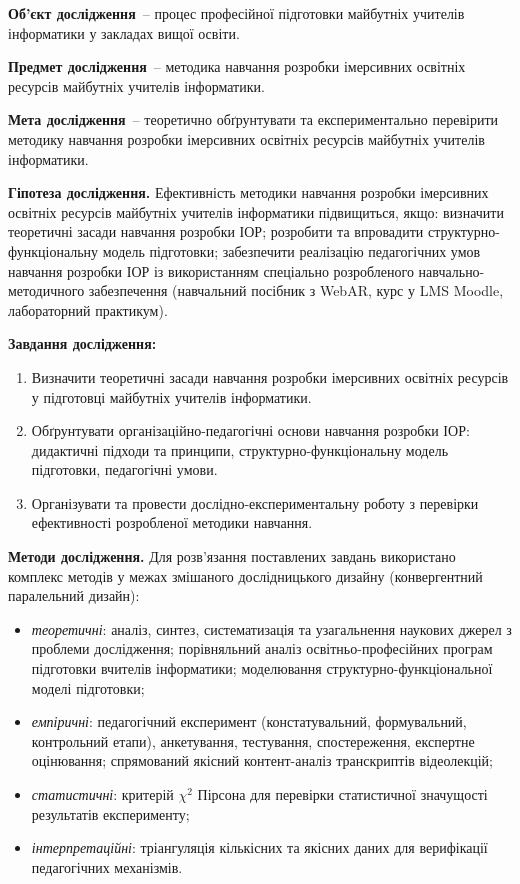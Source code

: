 \textbf{Об'єкт дослідження}~-- процес професійної підготовки майбутніх учителів інформатики у закладах вищої освіти.

\textbf{Предмет дослідження}~-- методика навчання розробки імерсивних освітніх ресурсів майбутніх учителів інформатики.

\textbf{Мета дослідження}~-- теоретично обґрунтувати та експериментально перевірити методику навчання розробки імерсивних освітніх ресурсів майбутніх учителів інформатики.

\textbf{Гіпотеза дослідження.} Ефективність методики навчання розробки імерсивних освітніх ресурсів майбутніх учителів інформатики підвищиться, якщо: визначити теоретичні засади навчання розробки ІОР; розробити та впровадити структурно-функціональну модель підготовки; забезпечити реалізацію педагогічних умов навчання розробки ІОР із використанням спеціально розробленого навчально-методичного забезпечення (навчальний посібник з WebAR, курс у LMS Moodle, лабораторний практикум).

\textbf{Завдання дослідження:}
\begin{enumerate}[label=\arabic*.]
    \item Визначити теоретичні засади навчання розробки імерсивних освітніх ресурсів у підготовці майбутніх учителів інформатики.
    \item Обґрунтувати організаційно-педагогічні основи навчання розробки ІОР: дидактичні підходи та принципи, структурно-функціональну модель підготовки, педагогічні умови.
    \item Організувати та провести дослідно-експериментальну роботу з перевірки ефективності розробленої методики навчання.
\end{enumerate}

\textbf{Методи дослідження.} Для розв'язання поставлених завдань використано комплекс методів у межах змішаного дослідницького дизайну (конвергентний паралельний дизайн):
\begin{itemize}
    \item \textit{теоретичні}: аналіз, синтез, систематизація та узагальнення наукових джерел з проблеми дослідження; порівняльний аналіз освітньо-професійних програм підготовки вчителів інформатики; моделювання структурно-функціональної моделі підготовки;
    \item \textit{емпіричні}: педагогічний експеримент (констатувальний, формувальний, контрольний етапи), анкетування, тестування, спостереження, експертне оцінювання; спрямований якісний контент-аналіз транскриптів відеолекцій;
    \item \textit{статистичні}: критерій $\chi^2$ Пірсона для перевірки статистичної значущості результатів експерименту;
    \item \textit{інтерпретаційні}: тріангуляція кількісних та якісних даних для верифікації педагогічних механізмів.
\end{itemize}

